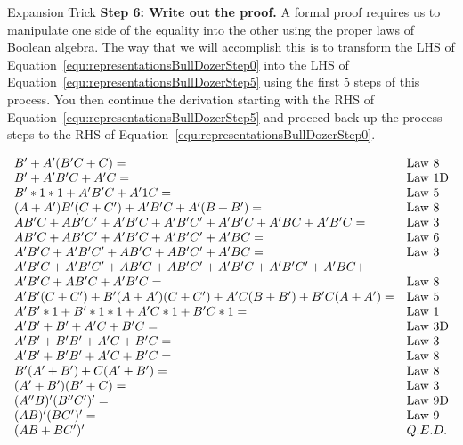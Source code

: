 \begin{process}{Expansion Trick}
\textbf{Step 6: Write out the proof.}
A formal proof requires us to manipulate one side of the equality into the
other using the proper laws of Boolean algebra.  The way that we will accomplish
this is to transform the LHS of Equation~\ref{equ:representationsBullDozerStep0} into 
the LHS of Equation~\ref{equ:representationsBullDozerStep5}
using the first 5 steps of this process.   You then continue the derivation starting
with the RHS of Equation~\ref{equ:representationsBullDozerStep5} and proceed
back up the process steps to the RHS of Equation~\ref{equ:representationsBullDozerStep0}.


$\begin{array}[ht]{ll}
B' + A'(B'C + C) =									& \text{Law 8} \\
B' + A'B'C + A'C = 								& \text{Law 1D} \\
B'*1*1 + A'B'C + A'1C = 							& \text{Law 5} \\
(A+A')B'(C+C') + A'B'C + A'(B+B') =						& \text{Law 8} \\
AB'C + AB'C' + A'B'C + A'B'C' + A'B'C + A'BC + A'B'C = 		& \text{Law 3} \\
AB'C + AB'C' + A'B'C + A'B'C' + A'BC =					& \text{Law 6} \\
A'B'C + A'B'C' + AB'C + AB'C' + A'BC =					& \text{Law 3} \\
A'B'C + A'B'C' + AB'C + AB'C' + A'B'C + A'B'C' + A'BC + 		&				\\
A'B'C + AB'C + A'B'C = 								& \text{Law 8} \\
A'B'(C+C') + B'(A + A')(C + C') + A'C(B+B') + B'C(A+A') =		& \text{Law 5} \\
A'B'*1 + B'*1*1 + A'C*1 + B'C*1 =						& \text{Law 1} \\
A'B' + B' + A'C + B'C =								& \text{Law 3D} \\
A'B' + B'B' + A'C + B'C =							& \text{Law 3} \\
A'B' + B'B' + A'C + B'C =							& \text{Law 8} \\
B'(A' + B') + C(A' + B') = 							& \text{Law 8} \\
(A' + B')(B' + C) =									& \text{Law 3} \\
(A''B)'(B''C')' = 									& \text{Law 9D} \\
(AB)'(BC')' = 									& \text{Law 9} \\
(AB + BC')'		& Q.E.D. \\
\end{array}$

\end{process}


